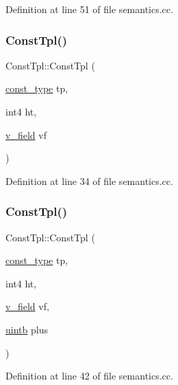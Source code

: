 Definition at line 51 of file semantics.\+cc.

\mbox{\label{class_const_tpl_ad962a583381d61306fe8d007bbca1c55}} 
\subsubsection{\texorpdfstring{ConstTpl()}{ConstTpl()}\hspace{0.1cm}{\footnotesize\ttfamily [6/7]}}
{\footnotesize\ttfamily Const\+Tpl\+::\+Const\+Tpl (\begin{DoxyParamCaption}\item[{\mbox{\hyperlink{class_const_tpl_af7f677ee5ef2e5af1becb0109793396b}{const\+\_\+type}}}]{tp,  }\item[{int4}]{ht,  }\item[{\mbox{\hyperlink{class_const_tpl_a4aa1b485e0cac884006d1aa35b3b0c57}{v\+\_\+field}}}]{vf }\end{DoxyParamCaption})}



Definition at line 34 of file semantics.\+cc.

\mbox{\label{class_const_tpl_a142aaf2a01641780bfc0911cf64f0faf}} 
\subsubsection{\texorpdfstring{ConstTpl()}{ConstTpl()}\hspace{0.1cm}{\footnotesize\ttfamily [7/7]}}
{\footnotesize\ttfamily Const\+Tpl\+::\+Const\+Tpl (\begin{DoxyParamCaption}\item[{\mbox{\hyperlink{class_const_tpl_af7f677ee5ef2e5af1becb0109793396b}{const\+\_\+type}}}]{tp,  }\item[{int4}]{ht,  }\item[{\mbox{\hyperlink{class_const_tpl_a4aa1b485e0cac884006d1aa35b3b0c57}{v\+\_\+field}}}]{vf,  }\item[{\mbox{\hyperlink{types_8h_a2db313c5d32a12b01d26ac9b3bca178f}{uintb}}}]{plus }\end{DoxyParamCaption})}



Definition at line 42 of file semantics.\+cc.



